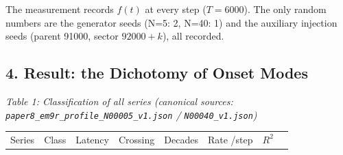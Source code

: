 \documentclass[
  a4paper,
]{article}
\newcounter{none} %
\begin{document}
The measurement records \(f(t)\) at every step (\(T=6000\)). The only
random numbers are the generator seeds (N=5: 2, N=40: 1) and the
auxiliary injection seeds (parent 91000, sector \(92000+k\)), all
recorded.

\subsection{4. Result: the Dichotomy of Onset
Modes}\label{result-the-dichotomy-of-onset-modes}

\emph{Table 1: Classification of all series (canonical sources:
\texttt{paper8\_em9r\_profile\_N00005\_v1.json} /
\texttt{N00040\_v1.json})}

{\def\LTcaptype{none} %
\begin{longtable}[]{@{}
  >{\raggedright\arraybackslash}p{}
  >{\raggedright\arraybackslash}p{}
  >{\raggedleft\arraybackslash}p{}
  >{\raggedleft\arraybackslash}p{}
  >{\raggedleft\arraybackslash}p{}
  >{\raggedleft\arraybackslash}p{}
  >{\raggedleft\arraybackslash}p{}
  >{\raggedleft\arraybackslash}p{}@{}}
\toprule\noalign{}
\begin{minipage}[b]{\linewidth}\raggedright
Series
\end{minipage} & \begin{minipage}[b]{\linewidth}\raggedright
Class
\end{minipage} & \begin{minipage}[b]{\linewidth}\raggedleft
Latency
\end{minipage} & \begin{minipage}[b]{\linewidth}\raggedleft
Crossing
\end{minipage} & \begin{minipage}[b]{\linewidth}\raggedleft
Decades
\end{minipage} & \begin{minipage}[b]{\linewidth}\raggedleft
Rate /step
\end{minipage} & \begin{minipage}[b]{\linewidth}\raggedleft
\(R^2\)
\end{minipage} & \begin{minipage}[b]{\linewidth}\raggedleft

\end{minipage}
\end{longtable}}
\end{document}
